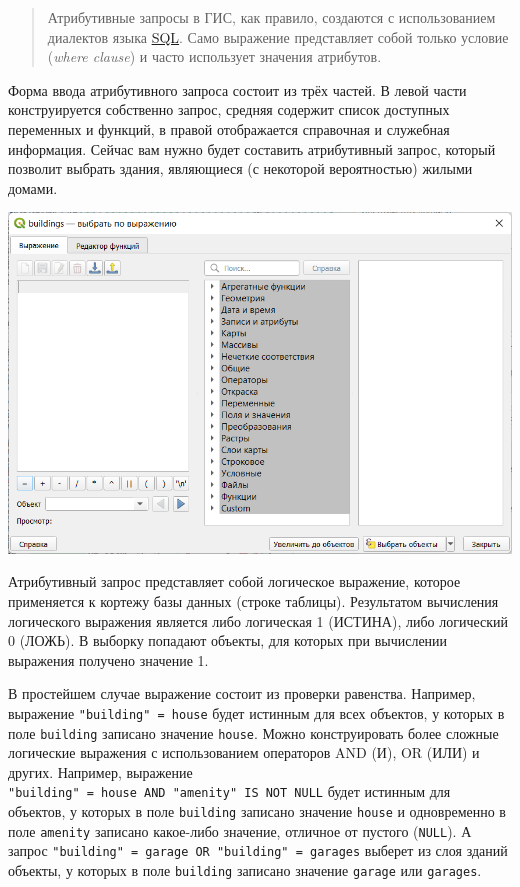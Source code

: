 \documentclass[
  12pt,
]{book}
\begin{document}
\begin{quote}
Атрибутивные запросы в ГИС, как правило, создаются с использованием диалектов языка \href{https://ru.wikipedia.org/wiki/SQL}{SQL}. Само выражение представляет собой только условие (\emph{where clause}) и часто использует значения атрибутов.
\end{quote}

Форма ввода атрибутивного запроса состоит из трёх частей. В левой части конструируется собственно запрос, средняя содержит список доступных переменных и функций, в правой отображается справочная и служебная информация. Сейчас вам нужно будет составить атрибутивный запрос, который позволит выбрать здания, являющиеся (с некоторой вероятностью) жилыми домами.

\includegraphics{images/Ex05_Vectorization/query_interface.png}

Атрибутивный запрос представляет собой логическое выражение, которое применяется к кортежу базы данных (строке таблицы). Результатом вычисления логического выражения является либо логическая 1 (ИСТИНА), либо логический 0 (ЛОЖЬ). В выборку попадают объекты, для которых при вычислении выражения получено значение 1.

В простейшем случае выражение состоит из проверки равенства. Например, выражение \texttt{"building"\ =\ \textquotesingle{}house\textquotesingle{}} будет истинным для всех объектов, у которых в поле \texttt{building} записано значение \texttt{house}. Можно конструировать более сложные логические выражения с использованием операторов AND (И), OR (ИЛИ) и других. Например, выражение \texttt{"building"\ =\ \textquotesingle{}house\textquotesingle{}\ AND\ "amenity"\ IS\ NOT\ NULL} будет истинным для объектов, у которых в поле \texttt{building} записано значение \texttt{house} и одновременно в поле \texttt{amenity} записано какое-либо значение, отличное от пустого (\texttt{NULL}). А запрос \texttt{"building"\ =\ \textquotesingle{}garage\textquotesingle{}\ OR\ "building"\ =\ \textquotesingle{}garages\textquotesingle{}} выберет из слоя зданий объекты, у которых в поле \texttt{building} записано значение \texttt{garage} или \texttt{garages}.
\end{document}
